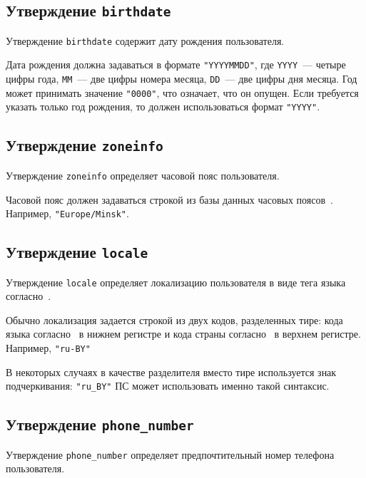 \subsection{Утверждение \lstinline{birthdate}}\label{CLAIMS.Birthdate}

Утверждение \lstinline{birthdate} содержит дату рождения пользователя. 

Дата рождения должна задаваться в формате \lstinline{"YYYYMMDD"},
где \lstinline{YYYY}~--- четыре цифры года, \lstinline{MM}~--- две цифры номера 
месяца, \lstinline{DD}~--- две цифры дня месяца.
%
Год может принимать значение \lstinline{"0000"}, что означает, что он опущен. 
%
Если требуется указать только год рождения, то должен использоваться формат 
\lstinline{"YYYY"}. 

\subsection{Утверждение \lstinline{zoneinfo}}\label{CLAIMS.ZoneInfo}

Утверждение \lstinline{zoneinfo} определяет часовой пояс пользователя.

Часовой пояс должен задаваться строкой из базы данных часовых 
поясов~\cite{RFC6557}. Например, \lstinline{"Europe/Minsk"}.

\subsection{Утверждение \lstinline{locale}}\label{CLAIMS.Locale}

Утверждение \lstinline{locale} определяет локализацию пользователя
в виде тега языка согласно~\cite{RFC5646}.

Обычно локализация задается строкой из двух кодов, разделенных тире: 
кода языка согласно~\cite{ISO639-1} в нижнем регистре и кода страны 
согласно~\cite{ISO3166-1} в верхнем регистре.
%
Например, \lstinline{"ru-BY"} 

В некоторых случаях в качестве разделителя вместо тире используется знак 
подчеркивания: \lstinline{"ru_BY"} ПС может использовать именно 
такой синтаксис.

\subsection{Утверждение \lstinline{phone_number}}\label{CLAIMS.PhoneNumber}

Утверждение \lstinline{phone_number} определяет предпочтительный номер телефона 
пользователя.

